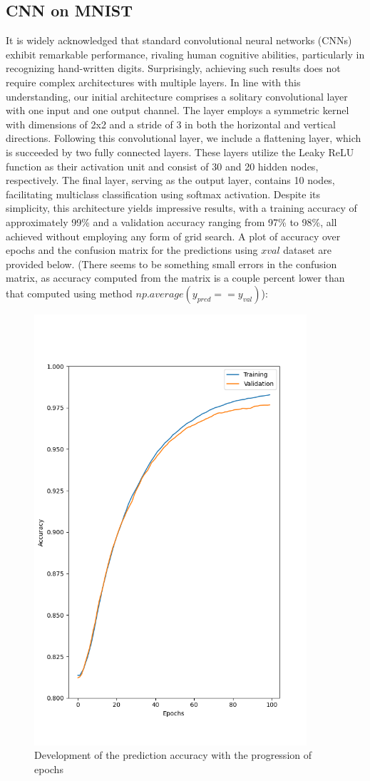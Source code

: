 \documentclass[onecolumn,10pt,cleanfoot]{asme2ej}
\begin{document}
\subsection{CNN on MNIST}
It is widely acknowledged that standard convolutional neural networks (CNNs) exhibit remarkable performance, rivaling human cognitive abilities, particularly in recognizing hand-written digits. Surprisingly, achieving such results does not require complex architectures with multiple layers. In line with this understanding, our initial architecture comprises a solitary convolutional layer with one input and one output channel. The layer employs a symmetric kernel with dimensions of 2x2 and a stride of 3 in both the horizontal and vertical directions. Following this convolutional layer, we include a flattening layer, which is succeeded by two fully connected layers. These layers utilize the Leaky ReLU function as their activation unit and consist of 30 and 20 hidden nodes, respectively. The final layer, serving as the output layer, contains 10 nodes, facilitating multiclass classification using softmax activation. Despite its simplicity, this architecture yields impressive results, with a training accuracy of approximately 99\% and a validation accuracy ranging from 97\% to 98\%, all achieved without employing any form of grid search. A plot of accuracy over epochs and the confusion matrix for the predictions using $\textit{xval}$ dataset are provided below. (There seems to be something small errors in the confusion matrix, as accuracy computed from the matrix is a couple percent lower than that computed using method $np.average(y_{pred} == y_{val})$):

\begin{figure}[H]
  \centering
	\includegraphics[width=0.9\textwidth, height=0.75\textwidth]{mnist28_trainVal_acc.png}
	\caption{Development of the prediction accuracy with the progression of epochs}
  \label{fig:MINST_acc}
\end{figure}
\end{document}
